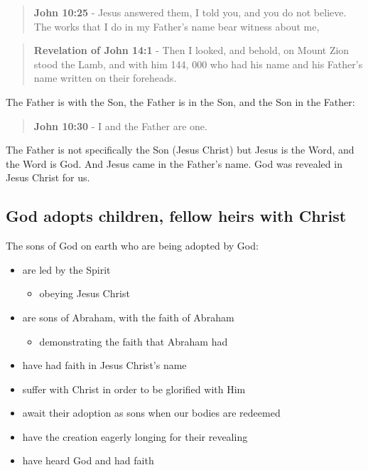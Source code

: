 \documentclass[11pt]{article}
\begin{document}
\begin{quote}
\textbf{John 10:25} - Jesus answered them, I told you, and you do not believe. The works that I do in my Father's name bear witness about me,
\end{quote}

\begin{quote}
\textbf{Revelation of John 14:1} - Then I looked, and behold, on Mount Zion stood the Lamb, and with him 144, 000 who had his name and his Father's name written on their foreheads.
\end{quote}

The Father is with the Son, the Father is in the Son, and the Son in the Father:

\begin{quote}
\textbf{John 10:30} - I and the Father are one.
\end{quote}

The Father is not specifically the Son (Jesus Christ) but Jesus is the Word, and the Word is God.
And Jesus came in the Father's name. God was revealed in Jesus Christ for us.

\subsection{God adopts children, fellow heirs with Christ}
\label{sec:org848d2b8}
The sons of God on earth who are being adopted by God:
\begin{itemize}
\item are led by the Spirit
\begin{itemize}
\item obeying Jesus Christ
\end{itemize}
\item are sons of Abraham, with the faith of Abraham
\begin{itemize}
\item demonstrating the faith that Abraham had
\end{itemize}
\item have had faith in Jesus Christ's name
\item suffer with Christ in order to be glorified with Him
\item await their adoption as sons when our bodies are redeemed
\item have the creation eagerly longing for their revealing
\item have heard God and had faith
\end{itemize}
\end{document}
